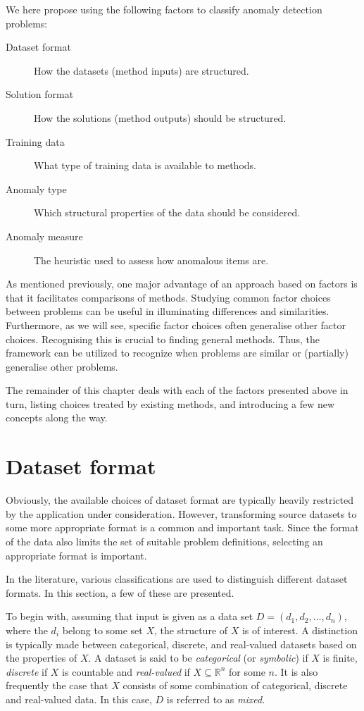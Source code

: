 We here propose using the following factors to classify anomaly detection problems:
\begin{description}
  \item[Dataset format] How the datasets (method inputs) are structured.
  \item[Solution format] How the solutions (method outputs) should be structured.
  \item[Training data] What type of training data is available to methods.
  \item[Anomaly type] Which structural properties of the data should be considered.
  \item[Anomaly measure] The heuristic used to assess how anomalous items are.
\end{description}
As mentioned previously, one major advantage of an approach based on factors is that it facilitates comparisons of methods. Studying common factor choices between problems can be useful in illuminating differences and similarities. Furthermore, as we will see, specific factor choices often generalise other factor choices. Recognising this is crucial to finding general methods. Thus, the framework can be utilized to recognize when problems are similar or (partially) generalise other problems.

The remainder of this chapter deals with each of the factors presented above in turn, listing choices treated by existing methods, and introducing a few new concepts along the way.

\section{Dataset format}
\label{sect:data_format}

Obviously, the available choices of dataset format are typically heavily restricted by the application under consideration. However, transforming source datasets to some more appropriate format is a common and important task. Since the format of the data also limits the set of suitable problem definitions, selecting an appropriate format is important.

In the literature, various classifications are used to distinguish different dataset formats. In this section, a few of these are presented.

To begin with, assuming that input is given as a data set $D = (d_1, d_2, \dots, d_n)$, where the $d_i$ belong to some set $X$, the structure of $X$ is of interest. A distinction is typically made between categorical, discrete, and real-valued datasets based on the properties of $X$. A dataset is said to be \emph{categorical} (or \emph{symbolic}) if $X$ is finite, \emph{discrete} if $X$ is countable and \emph{real-valued} if $X \subseteq \mathbb{R}^n$ for some $n$. It is also frequently the case that $X$ consists of some combination of categorical, discrete and real-valued data. In this case, $D$ is referred to as \emph{mixed}.


